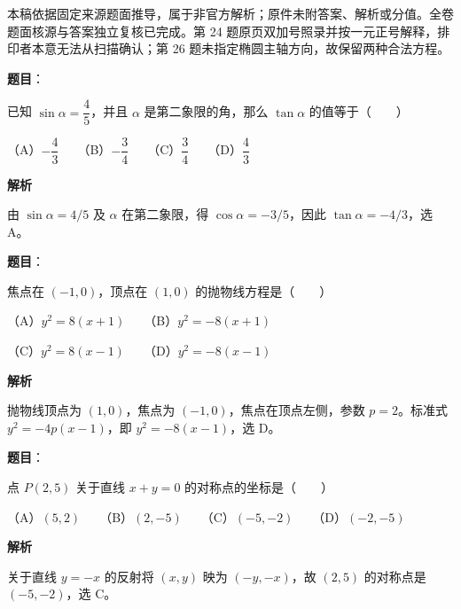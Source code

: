 

\begin{gktip}
本稿依据固定来源题面推导，属于非官方解析；原件未附答案、解析或分值。全卷题面核源与答案独立复核已完成。第 24 题原页双加号照录并按一元正号解释，排印者本意无法从扫描确认；第 26 题未指定椭圆主轴方向，故保留两种合法方程。
\end{gktip}

\begin{answer}

\textbf{题目}：

已知 $\sin\alpha=\dfrac45$，并且 $\alpha$ 是第二象限的角，那么 $\tan\alpha$ 的值等于\mbox{（　　）}

（A）$-\dfrac43$　　（B）$-\dfrac34$　　（C）$\dfrac34$　　（D）$\dfrac43$

\textbf{解析}

由 $\sin\alpha=4/5$ 及 $\alpha$ 在第二象限，得 $\cos\alpha=-3/5$，因此 $\tan\alpha=-4/3$，选 A。


\end{answer}
\begin{answer}

\textbf{题目}：

焦点在 $(-1,0)$，顶点在 $(1,0)$ 的抛物线方程是\mbox{（　　）}

（A）$y^2=8(x+1)$　　（B）$y^2=-8(x+1)$

（C）$y^2=8(x-1)$　　（D）$y^2=-8(x-1)$

\textbf{解析}

抛物线顶点为 $(1,0)$，焦点为 $(-1,0)$，焦点在顶点左侧，参数 $p=2$。标准式 $y^2=-4p(x-1)$，即 $y^2=-8(x-1)$，选 D。


\end{answer}
\begin{answer}

\textbf{题目}：

点 $P(2,5)$ 关于直线 $x+y=0$ 的对称点的坐标是\mbox{（　　）}

（A）$(5,2)$　　（B）$(2,-5)$　　（C）$(-5,-2)$　　（D）$(-2,-5)$

\textbf{解析}

关于直线 $y=-x$ 的反射将 $(x,y)$ 映为 $(-y,-x)$，故 $(2,5)$ 的对称点是 $(-5,-2)$，选 C。


\end{answer}
